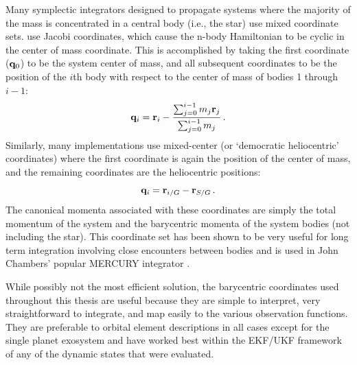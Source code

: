 Many symplectic integrators designed to propagate systems where the majority of the mass is concentrated in a central body (i.e., the star) use mixed coordinate sets.  \citet{wisdom1991symplectic} use Jacobi coordinates, which cause the n-body Hamiltonian to be cyclic in the center of mass coordinate.  This is accomplished by taking the first coordinate ($\mathbf q_0$) to be the system center of mass, and all subsequent coordinates to be the position of the $i$th body with respect to the center of mass of bodies 1 through $i-1$:
\begin{equation}
\mathbf q_i = \mathbf r_{i} - \frac{\sum_{j=0}^{i-1} m_j \mathbf r_{j}}{\sum_{j=0}^{i-1} m_j} \,.
\end{equation}
Similarly, many implementations use mixed-center (or `democratic heliocentric' coordinates) where the first coordinate is again the position of the center of mass, and the remaining coordinates are the heliocentric positions:
\begin{equation}
\mathbf q_i = \mathbf r_{i/G} - \mathbf r_{S/G} \,. 
\end{equation}
The canonical momenta associated with these coordinates are simply the total momentum of the system and the barycentric momenta of the system bodies (not including the star).  This coordinate set has been shown to be very useful for long term integration involving close encounters between bodies \citep{duncan1998multiple} and is used in John Chambers' popular MERCURY integrator \citep{chambers1999hybrid}.  

While possibly not the most efficient solution, the barycentric coordinates used throughout this thesis are  useful because they are simple to interpret, very straightforward to integrate, and map easily to the various observation functions.  They are preferable to orbital element descriptions
in all cases except for the single planet exosystem and have worked best within the EKF/UKF framework of any of the dynamic states that were evaluated.

